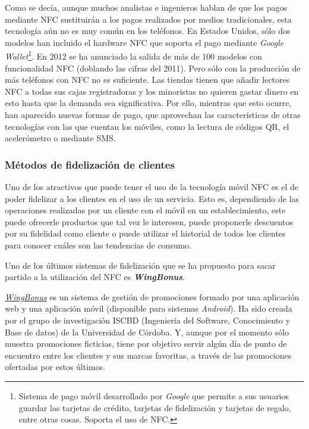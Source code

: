   Como se decía, aunque muchos analistas e ingenieros hablan de que los 
  pagos mediante \acs{NFC} sustituirán a los pagos realizados por medios
  tradicionales, esta tecnología aún no es muy común en los teléfonos. En
  Estados Unidos, sólo dos modelos han incluido el hardware \acs{NFC}
  que soporta el pago mediante \emph{Google Wallet}\footnote{Sistema de pago 
  móvil desarrollado por \emph{Google} que permite a sus usuarios guardar las 
  tarjetas de crédito, tarjetas de fidelización y tarjetas de regalo, entre 
  otras cosas. Soporta el uso de \acs{NFC}.}. En 2012 se ha anunciado
  la salida de más de 100 modelos con funcionalidad \acs{NFC} (doblando las 
  cifras del 2011). Pero sólo con la producción de más teléfonos con \acs{NFC} 
  no es suficiente. Las tiendas tienen que añadir lectores \acs{NFC} a todas
  sus cajas registradoras y los minoristas no quieren gastar dinero en esto
  hasta que la demanda sea significativa. Por ello, mientras que esto ocurre,
  han aparecido nuevas formas de pago, que aprovechan las características
  de otras tecnologías con las que cuentan los móviles, como la lectura de 
  códigos \acs{QR}, el acelerómetro o mediante \acs{SMS}\cite{bib:noWaiting}.

    \subsubsection{Métodos de fidelización de clientes}
  Uno de los atractivos que puede tener el uso de la tecnología móvil \acs{NFC}
  es el de poder fidelizar a los clientes en el uso de un servicio. Esto es,
  dependiendo de las operaciones realizadas por un cliente con el móvil en un
  establecimiento, este puede ofrecerle productos que tal vez le interesen,
  puede proponerle descuentos por su fidelidad como cliente o puede utilizar
  el historial de todos los clientes para conocer cuáles son las tendencias
  de consumo.
  
  Uno de los últimos sistemas de fidelización que se ha propuesto para sacar 
  partido a la utilización del \acs{NFC} es \emph{\textbf{WingBonus}}.

  \emph{\href{http://wingbonus.com/}{WingBonus}} es un sistema de
  gestión de promociones formado por una aplicación web y una aplicación móvil
  (disponible para sistemas \emph{Android}). Ha sido creada por el grupo de 
  investigación ISCBD (Ingeniería del Software, Conocimiento y Base de datos) 
  de la Universidad de Córdoba. Y, aunque por el momento sólo muestra 
  promociones ficticias, tiene por objetivo servir algún día de punto de 
  encuentro entre los clientes y sus marcas favoritas, a través de las 
  promociones ofertadas por estos últimos.
  
